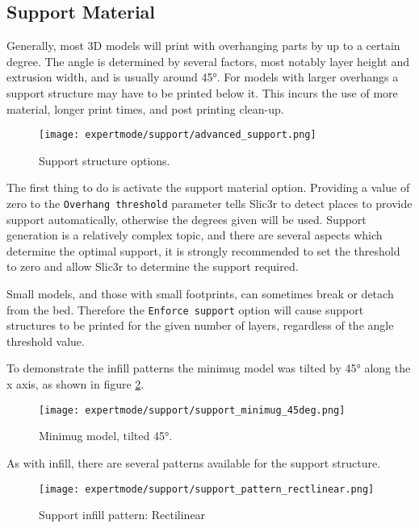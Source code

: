 \subsection{Support Material} %
\label{sec:support}

Generally, most 3D models will print with overhanging parts by up to a certain degree.  The angle is determined by several factors, most notably layer height and extrusion width, and is usually around 45°.  For models with larger overhangs a support structure may have to be printed below it.  This incurs the use of more material, longer print times, and post printing clean-up.

\begin{figure}[H]
\centering
\texttt{[image: expertmode/support/advanced\_support.png]}
\caption{Support structure options.}
\label{fig:advanced_support}
\end{figure}

The first thing to do is activate the support material option.  Providing a value of zero to the \texttt{Overhang threshold} parameter tells Slic3r to detect places to provide support automatically, otherwise the degrees given will be used.  Support generation is a relatively complex topic, and there are several aspects which determine the optimal support, it is strongly recommended to set the threshold to zero and allow Slic3r to determine the support required.

Small models, and those with small footprints, can sometimes break or detach from the bed.  Therefore the \texttt{Enforce support} option will cause support structures to be printed for the given number of layers, regardless of the angle threshold value.

To demonstrate the infill patterns the minimug model was tilted by 45° along the x axis, as shown in figure \ref{fig:support_minimug_45deg}.

\begin{figure}[H]
\centering
\texttt{[image: expertmode/support/support\_minimug\_45deg.png]}
\caption{Minimug model, tilted 45°.}
\label{fig:support_minimug_45deg}
\end{figure}

As with infill, there are several patterns available for the support structure.

\begin{figure}[H]
\centering
\texttt{[image: expertmode/support/support\_pattern\_rectlinear.png]}
\caption{Support infill pattern: Rectilinear}
\label{fig:support_pattern_rectlinear}
\end{figure}

